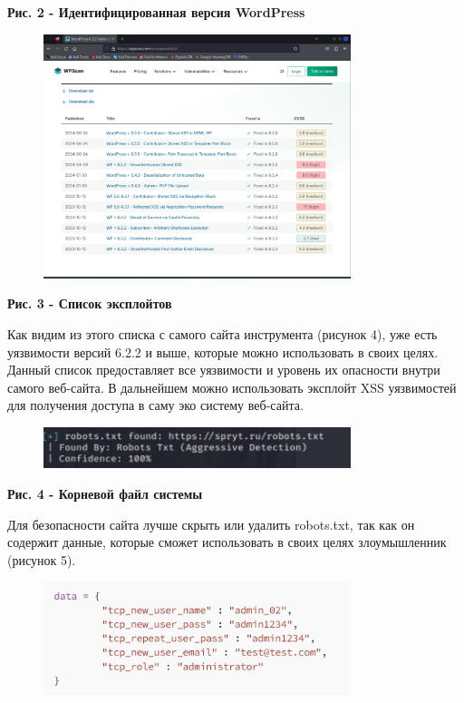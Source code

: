 {\bfseries Рис. 2 - Идентифицированная версия WordPress}

\begin{figure}[H]
	\centering
	\includegraphics[width=0.8\textwidth]{media/ict/image36}
	\caption*{}
\end{figure}


{\bfseries Рис. 3 - Список эксплойтов}

Как видим из этого списка с самого сайта инструмента (рисунок 4), уже
есть уязвимости версий 6.2.2 и выше, которые можно использовать в своих
целях. Данный список предоставляет все уязвимости и уровень их опасности
внутри самого веб-сайта. В дальнейшем можно использовать эксплойт XSS
уязвимостей для получения доступа в саму эко систему веб-сайта.

\begin{figure}[H]
	\centering
	\includegraphics[width=0.8\textwidth]{media/ict/image37}
	\caption*{}
\end{figure}


{\bfseries Рис. 4 - Корневой файл системы}

Для безопасности сайта лучше скрыть или удалить robots.txt, так как он
содержит данные, которые сможет использовать в своих целях злоумышленник
(рисунок 5).

\begin{figure}[H]
	\centering
	\includegraphics[width=0.8\textwidth]{media/ict/image38}
	\caption*{}
\end{figure}


